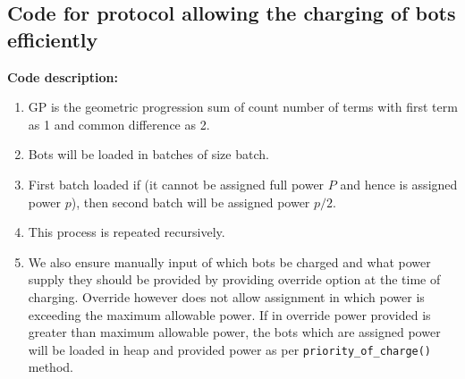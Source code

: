 \documentclass{article}
\begin{document}
\subsection{Code for protocol allowing the charging of bots efficiently}
\label{code:a}
\textbf{Code description: }
\begin{enumerate}
    \item GP is the geometric progression sum of count number of terms with first term as 1 and common difference as 2.
    \item  Bots will be loaded in batches of size batch.
    \item First batch loaded if (it cannot be assigned full power $P$ and hence is assigned power $p$), then second batch will be assigned power $p/2$.
    \item  This process is repeated recursively.
    \item We also ensure manually input of which bots be charged and what power supply they should be provided by providing override option at the time of charging. Override however does not allow assignment in which power is exceeding the maximum allowable power. If in override power provided is greater than maximum allowable power, the bots which are assigned power will be loaded in heap and provided power as per \lstinline[language=Python]{priority_of_charge()} method.
\end{enumerate}
\end{document}
